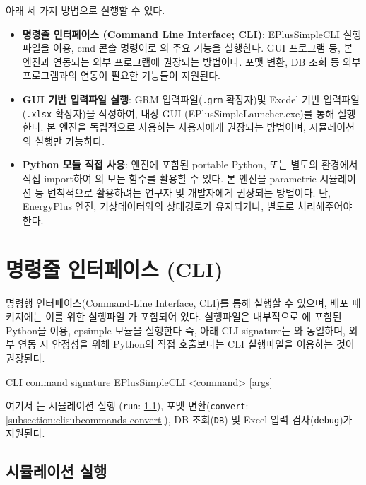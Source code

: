 \simulator\은 아래 세 가지 방법으로 실행할 수 있다.
\begin{itemize}
  \item \textbf{명령줄 인터페이스 (Command Line Interface; CLI)}: EPlusSimpleCLI 실행파일을 이용, cmd 콘솔 명령어로 \simulator 의 주요 기능을 실행한다. GUI 프로그램 등, 본 엔진과 연동되는 외부 프로그램에 권장되는 방법이다. 포맷 변환, DB 조회 등 외부 프로그램과의 연동이 필요한 기능들이 지원된다.
  \item \textbf{GUI 기반 입력파일 실행}: GRM 입력파일(\texttt{.grm} 확장자)및 Excdel 기반 입력파일(\texttt{.xlsx} 확장자)을 작성하여, 내장 GUI (EPlusSimpleLauncher.exe)를 통해 \simulator \를 실행한다. 본 엔진을 독립적으로 사용하는 사용자에게 권장되는 방법이며, 시뮬레이션의 실행만 가능하다.
  \item \textbf{Python 모듈 직접 사용}: 엔진에 포함된 portable Python, 또는 별도의 환경에서 \pymodule\을 직접 import하여 \simulator 의 모든 함수를 활용할 수 있다. 본 엔진을 parametric 시뮬레이션 등 변칙적으로 활용하려는 연구자 및 개발자에게 권장되는 방법이다. 단, EnergyPlus 엔진, 기상데이터와의 상대경로가 유지되거나, 별도로 처리해주어야 한다.
\end{itemize}


\section{명령줄 인터페이스 (CLI)}
\label{section:howtorun-cli}

\simulator\은 명령행 인터페이스(Command-Line Interface, CLI)를 통해 실행할 수 있으며, 배포 패키지에는 이를 위한 실행파일 가 포함되어 있다. 실행파일은 내부적으로 \simulator 에 포함된 Python을 이용, epsimple 모듈을 실행한다 즉, 아래 CLI signature는 와 동일하며, 외부 연동 시 안정성을 위해 Python의 직접 호출보다는 CLI 실행파일을 이용하는 것이 권장된다.

\begin{codeblock}{CLI command signature}
EPlusSimpleCLI <command> [args]
\end{codeblock}

여기서 는 시뮬레이션 실행 (\texttt{run}: \ref{subsection:clisubcommands-run}), 포맷 변환(\texttt{convert}: \ref{subsection:clisubcommands-convert}), DB 조회(\texttt{DB}) 및 Excel 입력 검사(\texttt{debug})가 지원된다.

\subsection{시뮬레이션 실행}
\label{subsection:clisubcommands-run}

